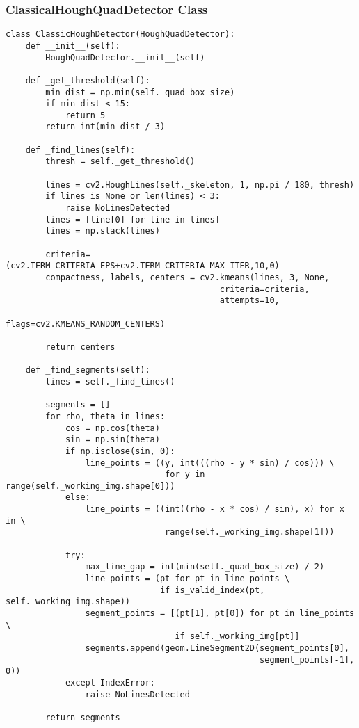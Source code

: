 \subsubsection{ClassicalHoughQuadDetector Class}

\begin{verbatim}
class ClassicHoughDetector(HoughQuadDetector):
    def __init__(self):
        HoughQuadDetector.__init__(self)
    
    def _get_threshold(self):
        min_dist = np.min(self._quad_box_size)
        if min_dist < 15:
            return 5
        return int(min_dist / 3)
    
    def _find_lines(self):
        thresh = self._get_threshold()
        
        lines = cv2.HoughLines(self._skeleton, 1, np.pi / 180, thresh)
        if lines is None or len(lines) < 3:
            raise NoLinesDetected
        lines = [line[0] for line in lines]
        lines = np.stack(lines)
        
        criteria=(cv2.TERM_CRITERIA_EPS+cv2.TERM_CRITERIA_MAX_ITER,10,0)
        compactness, labels, centers = cv2.kmeans(lines, 3, None, 
                                           criteria=criteria, 
                                           attempts=10, 
                                           flags=cv2.KMEANS_RANDOM_CENTERS)
        
        return centers
    
    def _find_segments(self):
        lines = self._find_lines()
        
        segments = []
        for rho, theta in lines:
            cos = np.cos(theta)
            sin = np.sin(theta)
            if np.isclose(sin, 0):
                line_points = ((y, int(((rho - y * sin) / cos))) \ 
                                for y in range(self._working_img.shape[0]))
            else:
                line_points = ((int((rho - x * cos) / sin), x) for x in \
                                range(self._working_img.shape[1]))
            
            try:
                max_line_gap = int(min(self._quad_box_size) / 2)
                line_points = (pt for pt in line_points \ 
                               if is_valid_index(pt, self._working_img.shape))
                segment_points = [(pt[1], pt[0]) for pt in line_points \
                                  if self._working_img[pt]]
                segments.append(geom.LineSegment2D(segment_points[0],
                                                   segment_points[-1], 0))
            except IndexError:
                raise NoLinesDetected
        
        return segments
\end{verbatim}

